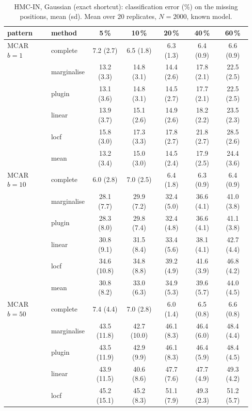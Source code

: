 \begin{table}[htbp]
  \centering
  \small
  \setlength{\tabcolsep}{4pt}
  \caption{HMC-IN, Gaussian (exact shortcut): classification error (\%) on the missing positions, mean (sd). Mean over 20 replicates, $N = 2000$, known model.}
  \label{tab:missing-err-hmc_in_gauss_k2}
  \begin{tabular}{llccccc}
    \toprule
    pattern & method & 5\,\% & 10\,\% & 20\,\% & 40\,\% & 60\,\% \\
    \midrule
    MCAR $b{=}1$ & complete & 7.2 (2.7) & 6.5 (1.8) & 6.3 (1.3) & 6.4 (0.9) & 6.6 (0.9) \\
     & marginalise & 13.2 (3.3) & 14.8 (3.1) & 14.4 (2.6) & 17.8 (2.1) & 22.5 (2.5) \\
     & plugin & 13.1 (3.6) & 14.8 (3.1) & 14.5 (2.7) & 17.7 (2.1) & 22.5 (2.5) \\
     & linear & 13.9 (3.7) & 15.1 (2.6) & 14.9 (2.6) & 18.2 (2.2) & 23.5 (2.3) \\
     & locf & 15.8 (3.0) & 17.3 (3.3) & 17.8 (2.7) & 21.8 (2.7) & 28.5 (2.6) \\
     & mean & 13.2 (3.4) & 15.0 (3.0) & 14.5 (2.4) & 17.9 (2.5) & 24.4 (3.6) \\
    \addlinespace
    MCAR $b{=}10$ & complete & 6.0 (2.8) & 7.0 (2.5) & 6.4 (1.8) & 6.3 (0.9) & 6.4 (0.9) \\
     & marginalise & 28.1 (7.7) & 29.9 (7.2) & 32.4 (5.0) & 36.6 (4.1) & 41.0 (3.8) \\
     & plugin & 28.3 (8.0) & 29.8 (7.4) & 32.4 (4.8) & 36.6 (4.1) & 41.1 (3.8) \\
     & linear & 30.8 (9.1) & 31.5 (8.4) & 33.4 (5.6) & 38.1 (4.1) & 42.7 (4.4) \\
     & locf & 34.6 (10.8) & 34.8 (8.8) & 39.2 (4.9) & 41.6 (3.9) & 46.8 (4.2) \\
     & mean & 30.8 (8.2) & 33.0 (6.3) & 34.9 (5.3) & 39.6 (5.7) & 44.0 (4.5) \\
    \addlinespace
    MCAR $b{=}50$ & complete & 7.4 (4.4) & 7.0 (2.8) & 6.0 (1.4) & 6.5 (0.8) & 6.6 (0.8) \\
     & marginalise & 43.5 (11.8) & 42.7 (10.0) & 46.1 (8.3) & 46.4 (6.0) & 48.4 (4.4) \\
     & plugin & 43.5 (11.9) & 42.9 (9.9) & 46.1 (8.3) & 46.4 (5.9) & 48.4 (4.5) \\
     & linear & 43.9 (11.5) & 40.6 (8.6) & 47.7 (7.6) & 47.7 (4.9) & 49.3 (4.2) \\
     & locf & 45.2 (15.1) & 45.2 (8.3) & 51.1 (7.9) & 49.3 (2.3) & 51.2 (5.7) \\

\end{tabular}
\end{table}
